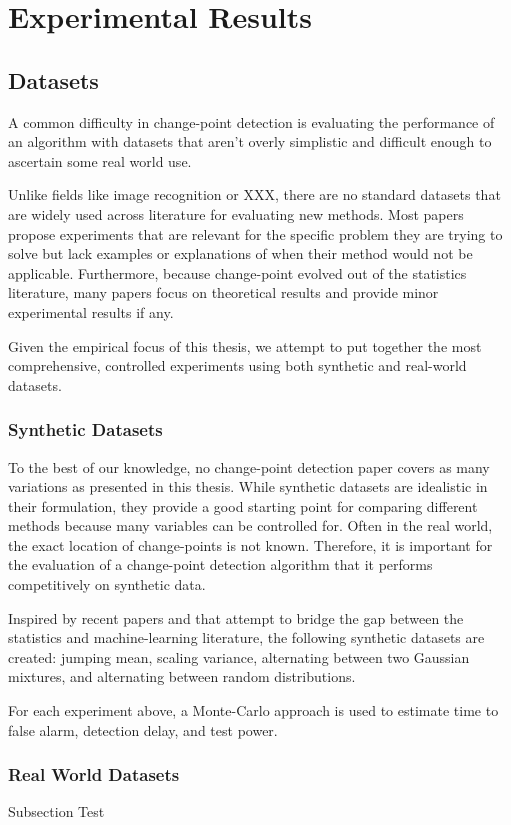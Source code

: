 \chapter{Experimental Results}
\section{Datasets}
A common difficulty in change-point detection is evaluating the performance of an algorithm with datasets that aren't overly simplistic and difficult enough to ascertain some real world use.

Unlike fields like image recognition or XXX, there are no standard datasets that are widely used across literature for evaluating new methods. Most papers propose experiments that are relevant for the specific problem they are trying to solve  but lack examples or explanations of when their method would not be applicable.  Furthermore, because change-point evolved out of the statistics literature, many papers focus on theoretical results and provide minor experimental results if any.

Given the empirical focus of this thesis, we attempt to put together the most comprehensive, controlled experiments using both synthetic and real-world datasets.
\subsection{Synthetic Datasets}
To the best of our knowledge, no change-point detection paper covers as many variations as presented in this thesis. While synthetic datasets are idealistic in their formulation, they provide a good starting point for comparing different methods because many variables can be controlled for. Often in the real world, the exact location of change-points is not known. Therefore, it is important for the evaluation of a change-point detection algorithm that it performs competitively on synthetic data.

Inspired by recent papers \cite{chang2019kernel} and \cite{flynn2019change} that attempt to bridge the gap between the statistics and machine-learning literature, the following synthetic datasets are created: jumping mean, scaling variance, alternating between two Gaussian mixtures, and alternating between random distributions.

For each experiment above, a Monte-Carlo approach is used to estimate time to false alarm, detection delay, and test power. 

\subsection{Real World Datasets}
Subsection Test
